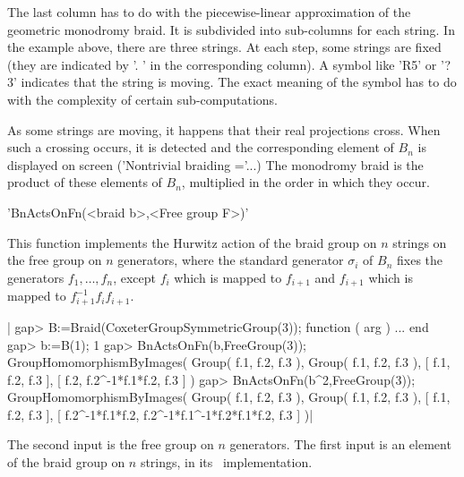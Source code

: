 The last column has to do with the piecewise-linear approximation of the
geometric monodromy  braid. It is  subdivided into sub-columns  for each
string. In  the example above,  there are  three strings. At  each step,
some strings are fixed (they are  indicated by '. ' in the corresponding
column). A symbol like 'R5' or '?3' indicates that the string is moving.
The exact meaning of the symbol has to do with the complexity of certain
sub-computations.

As  some strings  are moving,  it  happens that  their real  projections
cross. When such a crossing occurs, it is detected and the corresponding
element of $B_n$ is displayed on screen ('Nontrivial braiding ='...) The
monodromy braid is the product of these elements of $B_n$, multiplied in
the order in which they occur.


'BnActsOnFn(<braid b>,<Free group F>)'

This function  implements the Hurwitz action  of the braid group  on $n$
strings  on  the  free  group  on $n$  generators,  where  the  standard
generator  $\sigma_i$ of  $B_n$  fixes  the generators  $f_1,\dots,f_n$,
except $f_i$ which is mapped to  $f_{i+1}$ and $f_{i+1}$ which is mapped
to $f_{i+1}^{-1}f_if_{i+1}$.

|    gap> B:=Braid(CoxeterGroupSymmetricGroup(3));
    function ( arg ) ... end
    gap> b:=B(1);
    1
    gap> BnActsOnFn(b,FreeGroup(3));
    GroupHomomorphismByImages( Group( f.1, f.2, f.3 ), Group( f.1, f.2, f.3 ), 
    [ f.1, f.2, f.3 ], [ f.2, f.2^-1*f.1*f.2, f.3 ] )
    gap> BnActsOnFn(b^2,FreeGroup(3));
    GroupHomomorphismByImages( Group( f.1, f.2, f.3 ), Group( f.1, f.2, f.3 ), 
    [ f.1, f.2, f.3 ], [ f.2^-1*f.1*f.2, f.2^-1*f.1^-1*f.2*f.1*f.2, f.3 ] )|

The second input is the free group on $n$ generators. The first input is
an  element  of  the  braid  group  on  $n$  strings,  in  its  \CHEVIE\
implementation.
